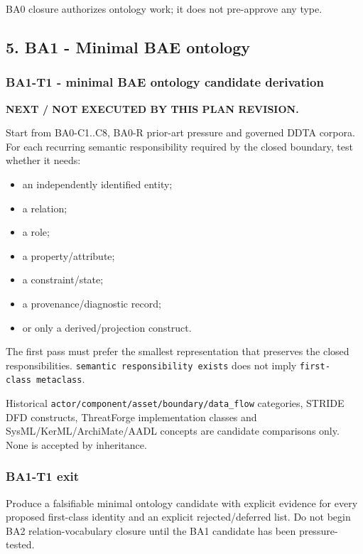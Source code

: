 \documentclass[
  10pt,
]{article}
\providecommand{\tightlist}{%
  \setlength{\itemsep}{0pt}\setlength{\parskip}{0pt}}
\begin{document}
BA0 closure authorizes ontology work; it does not pre-approve any type.

\subsection{5. BA1 - Minimal BAE
ontology}\label{ba1---minimal-bae-ontology}

\subsubsection{BA1-T1 - minimal BAE ontology candidate
derivation}\label{ba1-t1---minimal-bae-ontology-candidate-derivation}

\textbf{NEXT / NOT EXECUTED BY THIS PLAN REVISION.}

Start from BA0-C1..C8, BA0-R prior-art pressure and governed DDTA
corpora. For each recurring semantic responsibility required by the
closed boundary, test whether it needs:

\begin{itemize}
\tightlist
\item
  an independently identified entity;
\item
  a relation;
\item
  a role;
\item
  a property/attribute;
\item
  a constraint/state;
\item
  a provenance/diagnostic record;
\item
  or only a derived/projection construct.
\end{itemize}

The first pass must prefer the smallest representation that preserves
the closed responsibilities. \texttt{semantic\ responsibility\ exists}
does not imply \texttt{first-class\ metaclass}.

Historical \texttt{actor/component/asset/boundary/data\_flow}
categories, STRIDE DFD constructs, ThreatForge implementation classes
and SysML/KerML/ArchiMate/AADL concepts are candidate comparisons only.
None is accepted by inheritance.

\subsubsection{BA1-T1 exit}\label{ba1-t1-exit}

Produce a falsifiable minimal ontology candidate with explicit evidence
for every proposed first-class identity and an explicit
rejected/deferred list. Do not begin BA2 relation-vocabulary closure
until the BA1 candidate has been pressure-tested.
\end{document}
